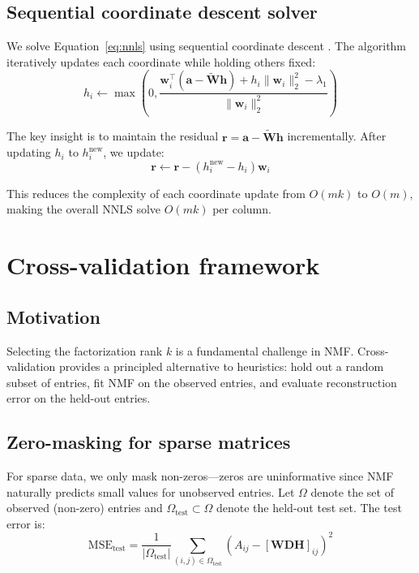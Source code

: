 \documentclass[11pt]{article}
\begin{document}
\subsection{Sequential coordinate descent solver}

We solve Equation~\ref{eq:nnls} using sequential coordinate descent 
\citep{Franc2005}. The algorithm iteratively updates each coordinate while 
holding others fixed:
\begin{equation}
  h_i \leftarrow \max\left(0, \frac{\mathbf{w}_i^\top(\mathbf{a} - 
  \tilde{\mathbf{W}}\mathbf{h}) + h_i \|\mathbf{w}_i\|_2^2 - \lambda_1}
  {\|\mathbf{w}_i\|_2^2}\right)
  \label{eq:cd_update}
\end{equation}

The key insight is to maintain the residual $\mathbf{r} = \mathbf{a} - 
\tilde{\mathbf{W}}\mathbf{h}$ incrementally. After updating $h_i$ to 
$h_i^{\text{new}}$, we update:
\begin{equation}
  \mathbf{r} \leftarrow \mathbf{r} - (h_i^{\text{new}} - h_i)\mathbf{w}_i
\end{equation}

This reduces the complexity of each coordinate update from $O(mk)$ to $O(m)$, 
making the overall NNLS solve $O(mk)$ per column.


\section{Cross-validation framework} \label{sec:crossvalidation}

\subsection{Motivation}

Selecting the factorization rank $k$ is a fundamental challenge in NMF. 
Cross-validation provides a principled alternative to heuristics: hold out a 
random subset of entries, fit NMF on the observed entries, and evaluate 
reconstruction error on the held-out entries.

\subsection{Zero-masking for sparse matrices}

For sparse data, we only mask non-zeros---zeros are uninformative since NMF 
naturally predicts small values for unobserved entries. Let $\Omega$ denote 
the set of observed (non-zero) entries and $\Omega_{\text{test}} \subset \Omega$ 
denote the held-out test set. The test error is:
\begin{equation}
  \text{MSE}_{\text{test}} = \frac{1}{|\Omega_{\text{test}}|} 
  \sum_{(i,j) \in \Omega_{\text{test}}} (A_{ij} - [\mathbf{W}\mathbf{D}
  \mathbf{H}]_{ij})^2
\end{equation}
\end{document}
